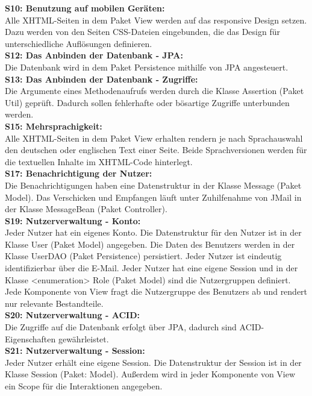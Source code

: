 \textbf{S10: Benutzung auf mobilen Geräten:}\\
Alle XHTML-Seiten in dem Paket View werden auf das responsive Design setzen.  Dazu werden von den Seiten CSS-Dateien eingebunden, die das Design für unterschiedliche Auflösungen definieren.\\

\textbf{S12: Das Anbinden der Datenbank - JPA:}\\
Die Datenbank wird in dem Paket Persistence mithilfe von JPA angesteuert. \\

\textbf{S13: Das Anbinden der Datenbank - Zugriffe:}\\
Die Argumente eines Methodenaufrufs werden durch die Klasse Assertion (Paket Util) geprüft. Dadurch sollen fehlerhafte oder bösartige Zugriffe unterbunden werden.\\

\textbf{S15: Mehrsprachigkeit:}\\
Alle XHTML-Seiten in dem Paket View erhalten rendern je nach Sprachauswahl den deutschen oder englischen Text einer Seite. Beide Sprachversionen werden für die textuellen Inhalte im XHTML-Code hinterlegt.\\

\textbf{S17: Benachrichtigung der Nutzer:}\\
Die Benachrichtigungen haben eine Datenstruktur in der Klasse Message (Paket Model). Das Verschicken und Empfangen läuft unter Zuhilfenahme von JMail in der Klasse MessageBean (Paket Controller).\\ 

\textbf{S19: Nutzerverwaltung - Konto:}\\
Jeder Nutzer hat ein eigenes Konto. Die Datenstruktur für den Nutzer ist in der Klasse User (Paket Model) angegeben. Die Daten des Benutzers werden in der Klasse UserDAO (Paket Persistence) persistiert. Jeder Nutzer ist eindeutig identifizierbar über die E-Mail.
Jeder Nutzer hat eine eigene Session und in der Klasse <enumeration> Role (Paket Model) sind die Nutzergruppen definiert. Jede Komponente von View fragt die Nutzergruppe des Benutzers ab und rendert nur relevante Bestandteile.\\ 

\textbf{S20: Nutzerverwaltung - ACID:}\\
Die Zugriffe auf die Datenbank erfolgt über JPA, dadurch sind ACID-Eigenschaften gewährleistet.\\

\textbf{S21: Nutzerverwaltung - Session:}\\
Jeder Nutzer erhält eine eigene Session.  Die Datenstruktur der Session ist in der Klasse Session (Paket: Model). Außerdem wird in jeder Komponente von View ein Scope für die Interaktionen angegeben.\\

